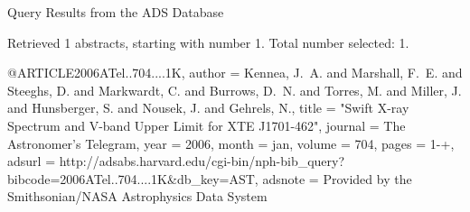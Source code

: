 Query Results from the ADS Database


Retrieved 1 abstracts, starting with number 1.  Total number selected: 1.

@ARTICLE{2006ATel..704....1K,
   author = {{Kennea}, J.~A. and {Marshall}, F.~E. and {Steeghs}, D. and 
	{Markwardt}, C. and {Burrows}, D.~N. and {Torres}, M. and {Miller}, J. and 
	{Hunsberger}, S. and {Nousek}, J. and {Gehrels}, N.},
    title = "{Swift X-ray Spectrum and V-band Upper Limit for XTE J1701-462}",
  journal = {The Astronomer's Telegram},
     year = 2006,
    month = jan,
   volume = 704,
    pages = {1-+},
   adsurl = {http://adsabs.harvard.edu/cgi-bin/nph-bib_query?bibcode=2006ATel..704....1K&db_key=AST},
  adsnote = {Provided by the Smithsonian/NASA Astrophysics Data System}
}


